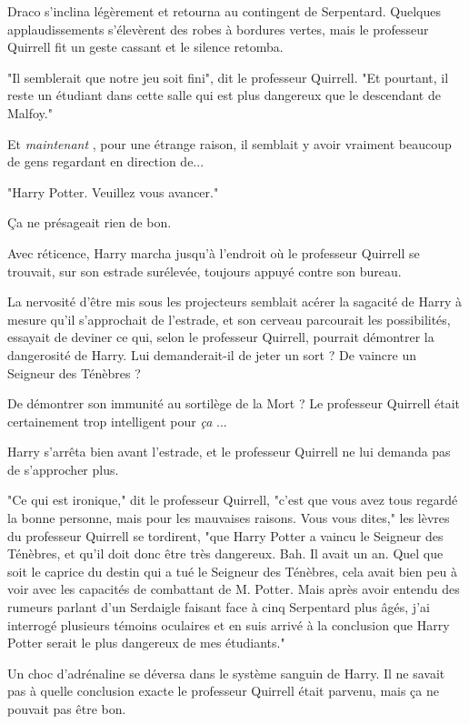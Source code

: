 Draco s'inclina légèrement et retourna au contingent de Serpentard. Quelques applaudissements s'élevèrent des robes à bordures vertes, mais le professeur Quirrell fit un geste cassant et le silence retomba.

"Il semblerait que notre jeu soit fini", dit le professeur Quirrell. "Et pourtant, il reste un étudiant dans cette salle qui est plus dangereux que le descendant de Malfoy."

Et \emph{maintenant} , pour une étrange raison, il semblait y avoir vraiment beaucoup de gens regardant en direction de...

"Harry Potter. Veuillez vous avancer."

Ça ne présageait rien de bon.

Avec réticence, Harry marcha jusqu'à l'endroit où le professeur Quirrell se trouvait, sur son estrade surélevée, toujours appuyé contre son bureau.

La nervosité d'être mis sous les projecteurs semblait acérer la sagacité de Harry à mesure qu'il s'approchait de l'estrade, et son cerveau parcourait les possibilités, essayait de deviner ce qui, selon le professeur Quirrell, pourrait démontrer la dangerosité de Harry. Lui demanderait-il de jeter un sort ? De vaincre un Seigneur des Ténèbres ?

De démontrer son immunité au sortilège de la Mort ? Le professeur Quirrell était certainement trop intelligent pour \emph{ça} ...

Harry s'arrêta bien avant l'estrade, et le professeur Quirrell ne lui demanda pas de s'approcher plus.

"Ce qui est ironique," dit le professeur Quirrell, "c'est que vous avez tous regardé la bonne personne, mais pour les mauvaises raisons. Vous vous dites," les lèvres du professeur Quirrell se tordirent, "que Harry Potter a vaincu le Seigneur des Ténèbres, et qu'il doit donc être très dangereux. Bah. Il avait un an. Quel que soit le caprice du destin qui a tué le Seigneur des Ténèbres, cela avait bien peu à voir avec les capacités de combattant de M. Potter. Mais après avoir entendu des rumeurs parlant d'un Serdaigle faisant face à cinq Serpentard plus âgés, j'ai interrogé plusieurs témoins oculaires et en suis arrivé à la conclusion que Harry Potter serait le plus dangereux de mes étudiants."

Un choc d'adrénaline se déversa dans le système sanguin de Harry. Il ne savait pas à quelle conclusion exacte le professeur Quirrell était parvenu, mais ça ne pouvait pas être bon.

